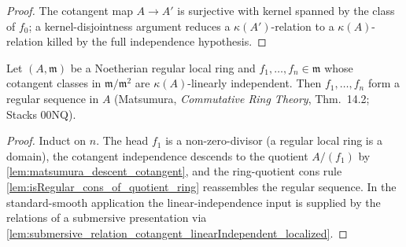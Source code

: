 \begin{proof}
  The cotangent map \(A \to A'\) is surjective with kernel
  spanned by the class of \(f_0\); a kernel-disjointness argument reduces a
  \(\kappa(A')\)-relation to a \(\kappa(A)\)-relation killed by the full independence
  hypothesis.
\end{proof}

\begin{lemma}\leanok
  \label{lem:matsumura_isRegular_of_linearIndependent_cotangent}
  Let \((A, \mathfrak m)\) be a Noetherian regular local ring and \(f_1,\dots,f_n \in
  \mathfrak m\) whose cotangent classes in \(\mathfrak m/\mathfrak m^2\) are
  \(\kappa(A)\)-linearly independent. Then \(f_1,\dots,f_n\) form a regular sequence in
  \(A\) (Matsumura, \emph{Commutative Ring Theory}, Thm.~14.2; Stacks 00NQ).
\end{lemma}

\begin{proof}
  Induct on \(n\). The head \(f_1\) is a non-zero-divisor
  (a regular local ring is a domain), the cotangent independence descends to the
  quotient \(A/(f_1)\) by \cref{lem:matsumura_descent_cotangent}, and the
  ring-quotient cons rule \cref{lem:isRegular_cons_of_quotient_ring} reassembles the
  regular sequence. In the standard-smooth application the linear-independence input is
  supplied by the relations of a submersive presentation via
  \cref{lem:submersive_relation_cotangent_linearIndependent_localized}.
\end{proof}


